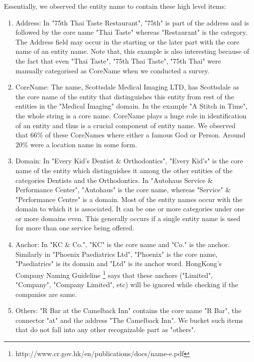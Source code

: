\documentclass{acm_proc_article-sp}
\begin{document}
Essentially, we observed the entity name to contain these high level items:
\begin{enumerate}

\item Address: In "75th Thai Taste Restaurant", "75th" is part of the address and is followed by the core name "Thai Taste" whereas "Restaurant" is the category. The Address field may occur in the starting or the later part with the core name of an entity name. Note that, this example is also interesting because of the fact that even "Thai Taste", "75th Thai Taste", "75th Thai" were manually categorised as CoreName when we conducted a survey.
\item CoreName:  The name, Scottsdale Medical Imaging LTD, has Scottsdale as the core name of the entity that distinguishes this entity from rest of the entities in the "Medical Imaging" domain. In the example "A Stitch in Time", the whole string is a core name. CoreName plays a huge role in identification of an entity and thus is a crucial component of entity name. We observed that 66\% of these CoreNames where either a famous God or Person. Around 20\% were a location name in some form.
\item Domain: In "Every Kid's Dentist \& Orthodontics", "Every Kid's" is the core name of the entity which distinguishes it among the other entities of the categories Dentists and the Orthodontics. In "Autohaus Service \& Performance Center", "Autohaus" is the core name, whereas "Service" \& "Performance Centre" is a domain. Most of the entity names occur with the domain to which it is associated. It can be one or more categories under one or more domains even. This generally occurs if a single entity name is used for more than one service being offered.
\item Anchor: In "KC \& Co.", "KC" is the core name and "Co." is the anchor. Similarly in "Phoenix Paediatrics Ltd", "Phoenix" is the core name, "Paediatrics" is its domain and "Ltd" is its anchor word. HongKong's Company Naming Guideline \footnote{http://www.cr.gov.hk/en/publications/docs/name-e.pdf} says that these anchors ("Limited", "Company", "Company Limited", etc) will be ignored while checking if the companies are same.
\item Others: "R Bar at the Camelback Inn" contains the core name "R Bar", the connector "at" and the address "The Camelback Inn". We bucket such items that do not fall into any other recognizable part as "others".
\end{enumerate}
\end{document}
